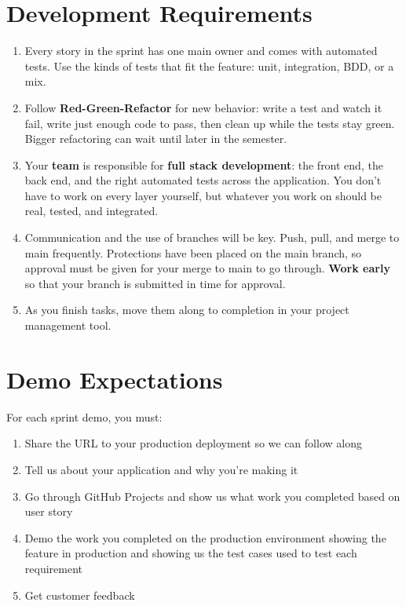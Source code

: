 \documentclass[11pt]{article}
\begin{document}
\section{Development Requirements}

\begin{enumerate}
    \item Every story in the sprint has one main owner and comes with automated tests. Use the kinds of tests that fit the feature: unit, integration, BDD, or a mix.
    
    \item Follow \textbf{Red-Green-Refactor} for new behavior: write a test and watch it fail, write just enough code to pass, then clean up while the tests stay green. Bigger refactoring can wait until later in the semester.
    
    \item Your \textbf{team} is responsible for \textbf{full stack development}: the front end, the back end, and the right automated tests across the application. You don't have to work on every layer yourself, but whatever you work on should be real, tested, and integrated.
    
    \item Communication and the use of branches will be key. Push, pull, and merge to main frequently. Protections have been placed on the main branch, so approval must be given for your merge to main to go through. \textbf{Work early} so that your branch is submitted in time for approval.
    
    \item As you finish tasks, move them along to completion in your project management tool.
\end{enumerate}

\section{Demo Expectations}

For each sprint demo, you must:
\begin{enumerate}
    \item Share the URL to your production deployment so we can follow along
    \item Tell us about your application and why you're making it
    \item Go through GitHub Projects and show us what work you completed based on user story
    \item Demo the work you completed on the production environment showing the feature in production and showing us the test cases used to test each requirement
    \item Get customer feedback
\end{enumerate}
\end{document}
